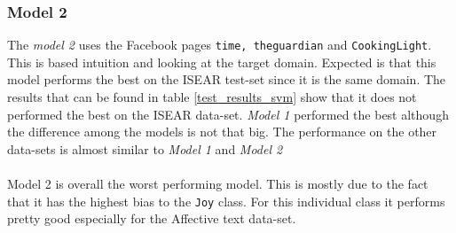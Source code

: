 \documentclass[11pt]{article}
\begin{document}
\subsubsection{Model 2}
The \textit{model 2} uses the Facebook pages \texttt{time, theguardian} and \texttt{CookingLight}. This is based intuition and looking at the target domain. Expected is that this model performs the best on the ISEAR test-set since it is the same domain. The results that can be found in table \ref{test_results_svm} show that it does not performed the best on the ISEAR data-set. \textit{Model 1}  performed the best although the difference among the models is not that big. The performance on the other data-sets is almost similar to  \textit{Model 1} and \textit{Model 2}\\\\
Model 2 is overall the worst performing model. This is mostly due to the fact that it has the highest bias to the \texttt{Joy} class. For this individual class it performs pretty good especially for the Affective text data-set.
\end{document}
